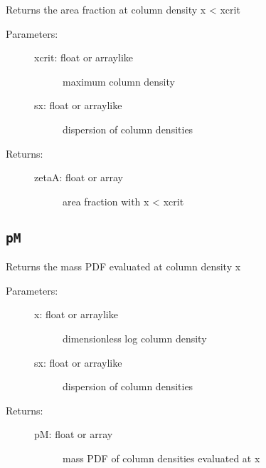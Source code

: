 \documentclass[letterpaper,10pt,english]{sphinxmanual}
\begin{document}
\begin{fulllineitems}
\label{fulldoc:despotic.winds.pwind_util.zetaA}
Returns the area fraction at column density x \textless{} xcrit
\begin{description}
\item[{Parameters:}] \leavevmode\begin{description}
\item[{xcrit: float or arraylike}] \leavevmode
maximum column density

\item[{sx: float or arraylike}] \leavevmode
dispersion of column densities

\end{description}

\item[{Returns:}] \leavevmode\begin{description}
\item[{zetaA: float or array}] \leavevmode
area fraction with x \textless{} xcrit

\end{description}

\end{description}

\end{fulllineitems}



\subsection{\texttt{pM}}
\label{fulldoc:pm}

\begin{fulllineitems}
\label{fulldoc:despotic.winds.pwind_util.pM}
Returns the mass PDF evaluated at column density x
\begin{description}
\item[{Parameters:}] \leavevmode\begin{description}
\item[{x: float or arraylike}] \leavevmode
dimensionless log column density

\item[{sx: float or arraylike}] \leavevmode
dispersion of column densities

\end{description}

\item[{Returns:}] \leavevmode\begin{description}
\item[{pM: float or array}] \leavevmode
mass PDF of column densities evaluated at x

\end{description}

\end{description}

\end{fulllineitems}
\end{document}
